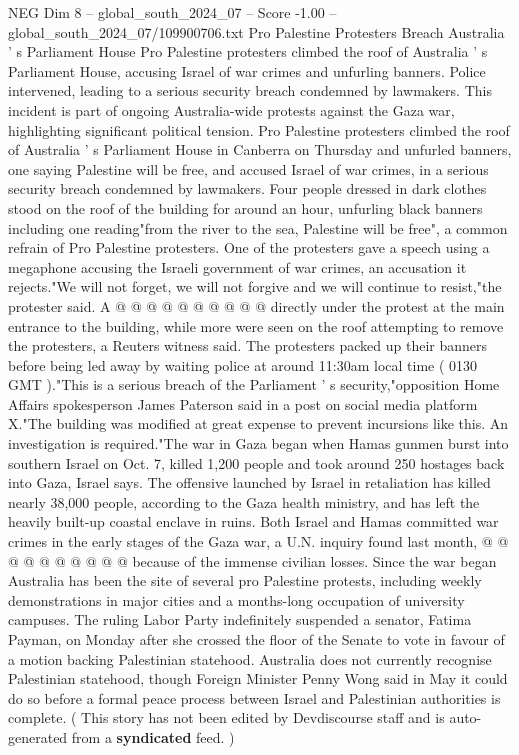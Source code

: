 \begin{textsample}{NEG Dim 8 – global\_south\_2024\_07 – Score -1.00 – global\_south\_2024\_07/109900706.txt}  \label{ex:f8_neg_111}
Pro Palestine Protesters Breach Australia ' s Parliament House Pro Palestine protesters climbed the roof of Australia ' s Parliament House, accusing Israel of war crimes and unfurling banners.
Police intervened, leading to a serious security breach condemned by lawmakers.
This incident is part of ongoing Australia-wide protests against the Gaza war, highlighting significant political tension.
Pro Palestine protesters climbed the roof of Australia ' s Parliament House in Canberra on Thursday and unfurled banners, one saying Palestine will be free, and accused Israel of war crimes, in a serious security breach condemned by lawmakers.
Four people dressed in dark clothes stood on the roof of the building for around an hour, unfurling black banners including one reading"from the river to the sea, Palestine will be free", a common refrain of Pro Palestine protesters.
One of the protesters gave a speech using a megaphone accusing the Israeli government of war crimes, an accusation it rejects."We will not forget, we will not forgive and we will continue to resist,"the protester said.
A @ @ @ @ @ @ @ @ @ @ directly under the protest at the main entrance to the building, while more were seen on the roof attempting to remove the protesters, a Reuters witness said.
The protesters packed up their banners before being led away by waiting police at around 11:30am local time ( 0130 GMT )."This is a serious breach of the Parliament ' s security,"opposition Home Affairs spokesperson James Paterson said in a post on social media platform X."The building was modified at great expense to prevent incursions like this.
An investigation is required."The war in Gaza began when Hamas gunmen burst into southern Israel on Oct. 7, killed 1,200 people and took around 250 hostages back into Gaza, Israel says.
The offensive launched by Israel in retaliation has killed nearly 38,000 people, according to the Gaza health ministry, and has left the heavily built-up coastal enclave in ruins.
Both Israel and Hamas committed war crimes in the early stages of the Gaza war, a U.N. inquiry found last month, @ @ @ @ @ @ @ @ @ @ because of the immense civilian losses.
Since the war began Australia has been the site of several pro Palestine protests, including weekly demonstrations in major cities and a months-long occupation of university campuses.
The ruling Labor Party indefinitely suspended a senator, Fatima Payman, on Monday after she crossed the floor of the Senate to vote in favour of a motion backing Palestinian statehood.
Australia does not currently recognise Palestinian statehood, though Foreign Minister Penny Wong said in May it could do so before a formal peace process between Israel and Palestinian authorities is complete. ( This story has not been edited by Devdiscourse staff and is auto-generated from a \textbf{syndicated} feed. )

\end{textsample}
